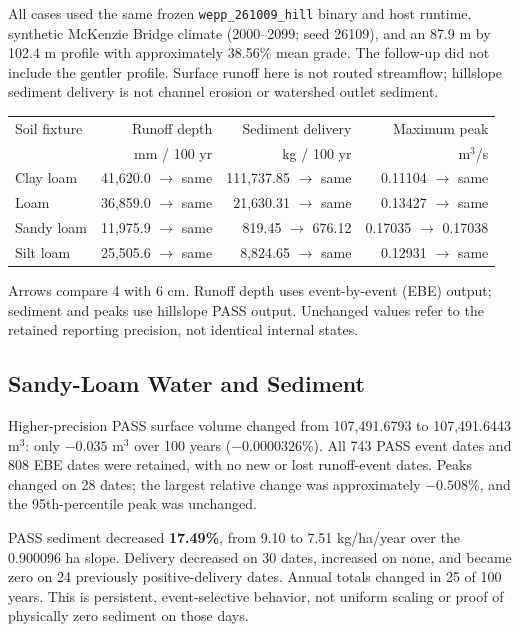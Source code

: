 All cases used the same frozen \texttt{wepp\_261009\_hill} binary and host runtime,
synthetic McKenzie Bridge climate (2000--2099; seed 26109), and an 87.9 m by
102.4 m profile with approximately 38.56\% mean grade. The follow-up did not
include the gentler profile. Surface runoff here is not routed streamflow;
hillslope sediment delivery is not channel erosion or watershed outlet sediment.

\begin{center}
\small
\begin{tabular}{lrrr}
\toprule
Soil fixture & Runoff depth & Sediment delivery & Maximum peak\\
 & mm / 100 yr & kg / 100 yr & m$^3$/s\\
\midrule
Clay loam & 41,620.0 $\to$ same & 111,737.85 $\to$ same & 0.11104 $\to$ same\\
Loam & 36,859.0 $\to$ same & 21,630.31 $\to$ same & 0.13427 $\to$ same\\
Sandy loam & 11,975.9 $\to$ same & 819.45 $\to$ 676.12 & 0.17035 $\to$ 0.17038\\
Silt loam & 25,505.6 $\to$ same & 8,824.65 $\to$ same & 0.12931 $\to$ same\\
\bottomrule
\end{tabular}
\end{center}
Arrows compare 4 with 6 cm. Runoff depth uses event-by-event (EBE) output;
sediment and peaks use hillslope PASS output. Unchanged values refer to the
retained reporting precision, not identical internal states.

\subsection{Sandy-Loam Water and Sediment}
Higher-precision PASS surface volume changed from 107,491.6793 to
107,491.6443 m$^3$: only $-0.035$ m$^3$ over 100 years ($-0.0000326$\%).
All 743 PASS event dates and 808 EBE dates were retained, with no new or lost
runoff-event dates. Peaks changed on 28 dates; the largest relative change was
approximately $-0.508$\%, and the 95th-percentile peak was unchanged.

PASS sediment decreased \textbf{17.49\%}, from 9.10 to 7.51 kg/ha/year over
the 0.900096 ha slope. Delivery decreased on 30 dates, increased on none, and
became zero on 24 previously positive-delivery dates. Annual totals changed in
25 of 100 years. This is persistent, event-selective behavior, not uniform
scaling or proof of physically zero sediment on those days.


